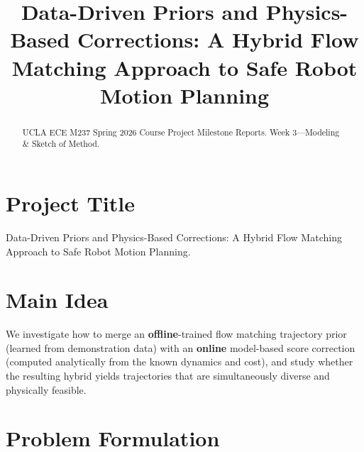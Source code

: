 \documentclass[conference]{IEEEtran}
\begin{document}
\title{Data-Driven Priors and Physics-Based Corrections: A Hybrid Flow
Matching Approach to Safe Robot Motion Planning}

\author{
  \and
}

\maketitle

\begin{abstract}
  UCLA ECE M237 Spring 2026 Course Project Milestone Reports. Week
  3---Modeling \& Sketch of Method.
\end{abstract}

\section{Project Title}


\noindent Data-Driven Priors and Physics-Based Corrections: A Hybrid
Flow Matching Approach to Safe Robot Motion Planning.

\section{Main Idea}


We investigate how to merge an \textbf{offline}-trained flow matching
trajectory prior (learned from demonstration data) with an
\textbf{online} model-based score correction (computed analytically
from the known dynamics and cost), and study whether the resulting
hybrid yields trajectories that are simultaneously diverse and
physically feasible.

\section{Problem Formulation}

\end{document}

